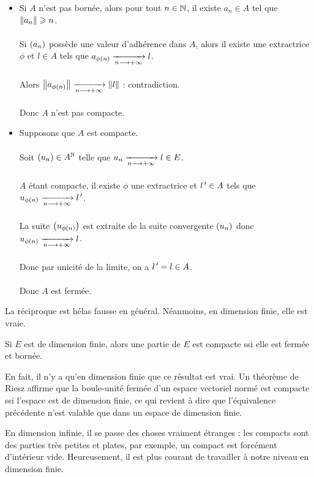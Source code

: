 \begin{dem}
\begin{itemize}
    \item Si \(A\) n'est pas bornée, alors pour tout \(n\in\mathbb{N}\), il existe \(a_n\in A\) tel que \(\norme{a_n}\geq n\). \\\\ Si \(\left(a_n\right)\) possède une valeur d'adhérence dans \(A\), alors il existe une extractrice \(\phi\) et \(l\in A\) tels que \(a_{\phi\left(n\right)}\xrightarrow[n\longrightarrow+\infty]{}l\). \\\\ Alors \(\norme{a_{\phi\paren{n}}}\tendqd{n\to\pinf}\norme{l}\) : contradiction. \\\\ Donc \(A\) n'est pas compacte. \\
    \item Supposons que \(A\) est compacte. \\\\ Soit \(\left(u_n\right)\in A^{\mathbb{N}}\) telle que \(u_n\xrightarrow[n\longrightarrow+\infty]{}l\in E\). \\\\ \(A\) étant compacte, il existe \(\phi\) une extractrice et \(l^{\,\prime}\in A\) tels que \(u_{\phi\left(n\right)}\xrightarrow[n\longrightarrow+\infty]{}l^{\,\prime}\). \\\\ La suite \(\left(u_{\phi\left(n\right)}\right)\) est extraite de la suite convergente \(\left(u_n\right)\) donc \(u_{\phi\left(n\right)}\xrightarrow[n\longrightarrow+\infty]{}l\). \\\\ Donc par unicité de la limite, on a \(l^{\,\prime}=l\in A\). \\\\ Donc \(A\) est fermée.
\end{itemize}
\end{dem}

La réciproque est hélas fausse en général. Néanmoins, en dimension finie, elle est vraie.

\begin{prop}
Si \(E\) est de dimension finie, alors une partie de \(E\) est compacte ssi elle est fermée et bornée.
\end{prop}

\begin{rem}
En fait, il n'y a qu'en dimension finie que ce résultat est vrai. Un théorème de Riesz affirme que la boule-unité fermée d'un espace vectoriel normé est compacte ssi l'espace est de dimension finie, ce qui revient à dire que l'équivalence précédente n'est valable que dans un espace de dimension finie.

En dimension infinie, il se passe des choses vraiment étranges : les compacts sont des parties très petites et plates, par exemple, un compact est forcément d'intérieur vide. Heureusement, il est plus courant de travailler à notre niveau en dimension finie.
\end{rem}

